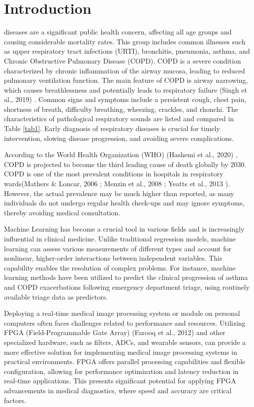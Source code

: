 \section{Introduction}
\label{sec:introduction}
 diseases are a significant public health concern, affecting all age groups and causing considerable mortality rates. This group includes common illnesses such as upper respiratory tract infections (URTI), bronchitis, pneumonia, asthma, and Chronic Obstructive Pulmonary Disease (COPD). COPD is a severe condition characterized by chronic inflammation of the airway mucosa, leading to reduced pulmonary ventilation function. The main feature of COPD is airway narrowing, which causes breathlessness and potentially leads to respiratory failure (Singh et al., 2019) \cite{b01}. Common signs and symptoms include a persistent cough, chest pain, shortness of breath, difficulty breathing, wheezing, crackles, and rhonchi. The characteristics of pathological respiratory sounds are listed and compared in Table \ref{tab1}. Early diagnosis of respiratory diseases is crucial for timely intervention, slowing disease progression, and avoiding severe complications.

According to the World Health Organization (WHO) (Hashemi et al., 2020) \cite{b02}, COPD is projected to become the third leading cause of death globally by 2030. COPD is one of the most prevalent conditions in hospitals in respiratory wards(Mathers \& Loncar, 2006 \cite{b03}; Menzin et al., 2008 \cite{b04}; Yeatts et al., 2013 \cite{b05}). However, the actual prevalence may be much higher than reported, as many individuals do not undergo regular health check-ups and may ignore symptoms, thereby avoiding medical consultation.

Machine Learning has become a crucial tool in various fields and is increasingly influential in clinical medicine. Unlike traditional regression models, machine learning can assess various measurements of different types and account for nonlinear, higher-order interactions between independent variables. This capability enables the resolution of complex problems. For instance, machine learning methods have been utilized to predict the clinical progression of asthma and COPD exacerbations following emergency department triage, using routinely available triage data as predictors.

Deploying a real-time medical image processing system or module on personal computers often faces challenges related to performance and resources. Utilizing FPGA (Field-Programmable Gate Array) (Farooq et al., 2012) \cite{b06} and other specialized hardware, such as filters, ADCs, and wearable sensors, can provide a more effective solution for implementing medical image processing systems in practical environments. FPGA offers parallel processing capabilities and flexible configuration, allowing for performance optimization and latency reduction in real-time applications. This presents significant potential for applying FPGA advancements in medical diagnostics, where speed and accuracy are critical factors.


